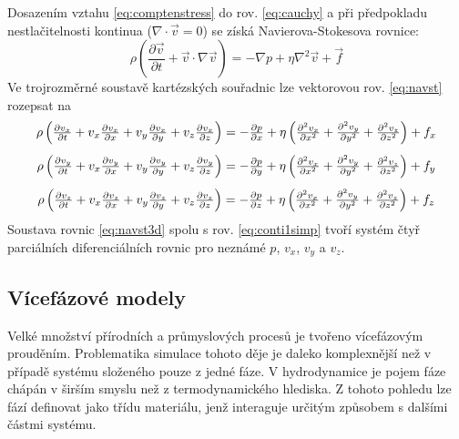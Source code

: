 Dosazením vztahu \ref{eq:comptenstress} do rov. \ref{eq:cauchy} a při předpokladu nestlačitelnosti kontinua ($\nabla \cdot \vec{v} = 0$) se získá Navierova-Stokesova rovnice:
\begin{equation}
    \rho \left( \frac{\partial \vec{v}}{\partial t} + \vec{v} \cdot \nabla  \vec{v} \right) = -\nabla p + \eta \nabla^{2}\vec{v}  + \vec{f}
  	\label{eq:navst}
\end{equation} 
Ve trojrozměrné soustavě kartézských souřadnic lze vektorovou rov. \ref{eq:navst} rozepsat na 
\begin{equation}
\begin{array}{c}
    \rho \left( \frac{\partial v_{x}}{\partial t} + v_{x}\frac{\partial v_{x}}{\partial x} + v_{y}\frac{\partial v_{x}}{\partial y} + v_{z}\frac{\partial v_{x}}{\partial z} \right) = -\frac{\partial p}{\partial x} +  \eta \left( \frac{\partial^{2} v_{x}}{\partial x^{2}} + \frac{\partial^{2} v_{y}}{\partial y^{2}} + \frac{\partial^{2} v_{z}}{\partial z^{2}} \right) + f_{x}   \vspace{3mm} \\
    
    \rho \left( \frac{\partial v_{y}}{\partial t} + v_{x}\frac{\partial v_{y}}{\partial x} + v_{y}\frac{\partial v_{y}}{\partial y} + v_{z}\frac{\partial v_{y}}{\partial z} \right) = -\frac{\partial p}{\partial y} +  \eta \left( \frac{\partial^{2} v_{x}}{\partial x^{2}} + \frac{\partial^{2} v_{y}}{\partial y^{2}} + \frac{\partial^{2} v_{z}}{\partial z^{2}} \right) + f_{y}   \vspace{3mm} \\
    
    \rho \left( \frac{\partial v_{z}}{\partial t} + v_{x}\frac{\partial v_{z}}{\partial x} + v_{y}\frac{\partial v_{z}}{\partial y} + v_{z}\frac{\partial v_{z}}{\partial z} \right) = -\frac{\partial p}{\partial z} +  \eta \left( \frac{\partial^{2} v_{x}}{\partial x^{2}} + \frac{\partial^{2} v_{y}}{\partial y^{2}} + \frac{\partial^{2} v_{z}}{\partial z^{2}} \right) + f_{z}   \\
    \end{array}
  	\label{eq:navst3d}
\end{equation} 
Soustava rovnic \ref{eq:navst3d} spolu s rov. \ref{eq:conti1simp} tvoří systém čtyř parciálních diferenciálních rovnic pro neznámé $p$, $v_{x}$, $v_{y}$ a $v_{z}$. 

\subsection{Vícefázové modely}
Velké množství přírodních a průmyslových procesů je tvořeno vícefázovým prouděním. Problematika simulace tohoto děje je daleko komplexnější než v případě systému složeného pouze z jedné fáze. V hydrodynamice je pojem fáze chápán v širším smyslu než z termodynamického hlediska. Z tohoto pohledu lze fází definovat jako třídu materiálu, jenž interaguje určitým způsobem s dalšími částmi systému. 

